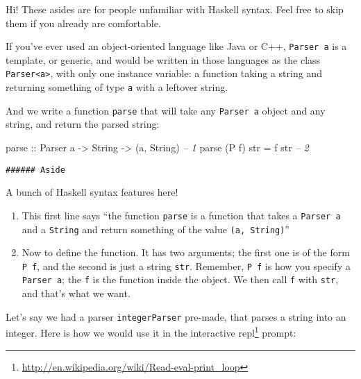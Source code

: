 \documentclass[]{article}
\newenvironment{Shaded}{}{}
\newcommand{\DataTypeTok}[1]{\textcolor[rgb]{0.56,0.13,0.00}{{#1}}}
\newcommand{\CommentTok}[1]{\textcolor[rgb]{0.38,0.63,0.69}{\textit{{#1}}}}
\newcommand{\OtherTok}[1]{\textcolor[rgb]{0.00,0.44,0.13}{{#1}}}
\newcommand{\FunctionTok}[1]{\textcolor[rgb]{0.02,0.16,0.49}{{#1}}}
\newcommand{\NormalTok}[1]{{#1}}
\renewcommand{\href}[2]{#2\footnote{\url{#1}}}
\begin{document}
Hi! These asides are for people unfamiliar with Haskell syntax. Feel
free to skip them if you already are comfortable.

If you've ever used an object-oriented language like Java or C++,
\texttt{Parser\ a} is a template, or generic, and would be written in
those languages as the class \texttt{Parser\textless{}a\textgreater{}},
with only one instance variable: a function taking a string and
returning something of type \texttt{a} with a leftover string.

And we write a function \texttt{parse} that will take any
\texttt{Parser\ a} object and any string, and return the parsed string:

\begin{Shaded}
\begin{Highlighting}[]
\OtherTok{parse ::} \DataTypeTok{Parser} \NormalTok{a }\OtherTok{->} \DataTypeTok{String} \OtherTok{->} \NormalTok{(a, }\DataTypeTok{String}\NormalTok{)              }\CommentTok{-- 1}
\NormalTok{parse (}\DataTypeTok{P} \NormalTok{f) str }\FunctionTok{=} \NormalTok{f str                                 }\CommentTok{-- 2}
\end{Highlighting}
\end{Shaded}

\begin{verbatim}
###### Aside
\end{verbatim}

A bunch of Haskell syntax features here!

\begin{enumerate}
\def\labelenumi{\arabic{enumi}.}
\item
  This first line says ``the function \texttt{parse} is a function that
  takes a \texttt{Parser\ a} and a \texttt{String} and return something
  of the value \texttt{(a,\ String)}''
\item
  Now to define the function. It has two arguments; the first one is of
  the form \texttt{P\ f}, and the second is just a string \texttt{str}.
  Remember, \texttt{P\ f} is how you specify a \texttt{Parser\ a}; the
  \texttt{f} is the function inside the object. We then call \texttt{f}
  with \texttt{str}, and that's what we want.
\end{enumerate}

Let's say we had a parser \texttt{integerParser} pre-made, that parses a
string into an integer. Here is how we would use it in the interactive
\href{http://en.wikipedia.org/wiki/Read-eval-print_loop}{repl} prompt:
\end{document}
